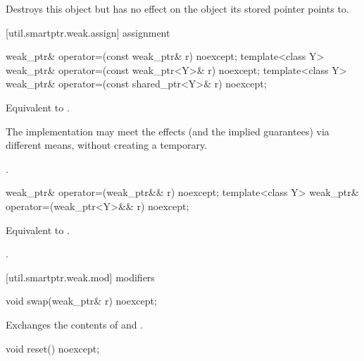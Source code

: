 \begin{itemdescr}
\pnum\effects  Destroys this  object but has no
effect on the object its stored pointer points to.
\end{itemdescr}

[util.smartptr.weak.assign]{ assignment}

%
%
\begin{itemdecl}
weak_ptr& operator=(const weak_ptr& r) noexcept;
template<class Y> weak_ptr& operator=(const weak_ptr<Y>& r) noexcept;
template<class Y> weak_ptr& operator=(const shared_ptr<Y>& r) noexcept;
\end{itemdecl}

\begin{itemdescr}
\pnum\effects  Equivalent to .

\pnum\remarks  The implementation may meet the effects (and the
implied guarantees) via different means, without creating a temporary.

\pnum\returns  {}.
\end{itemdescr}

%
%
\begin{itemdecl}
weak_ptr& operator=(weak_ptr&& r) noexcept;
template<class Y> weak_ptr& operator=(weak_ptr<Y>&& r) noexcept;
\end{itemdecl}

\begin{itemdescr}
\pnum\effects  Equivalent to .

\pnum\returns  {}.
\end{itemdescr}

[util.smartptr.weak.mod]{ modifiers}
%
%
\begin{itemdecl}
void swap(weak_ptr& r) noexcept;
\end{itemdecl}

\begin{itemdescr}
\pnum\effects  Exchanges the contents of  and .
\end{itemdescr}

%
%
\begin{itemdecl}
void reset() noexcept;
\end{itemdecl}

